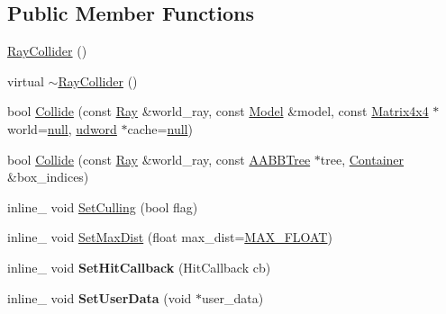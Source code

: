 \subsection*{Public Member Functions}
\begin{DoxyCompactItemize}
\item 
\hyperlink{classOpcode_1_1RayCollider_a541dfc80f2a2e1475bddbf686a3b0090}{Ray\+Collider} ()
\item 
virtual \hyperlink{classOpcode_1_1RayCollider_ac8ff51bee4566173003732f89655b00f}{$\sim$\+Ray\+Collider} ()
\item 
bool \hyperlink{classOpcode_1_1RayCollider_a164bc0ce6313621e1bcc5a57381defc0}{Collide} (const \hyperlink{classOpcode_1_1Ray}{Ray} \&world\+\_\+ray, const \hyperlink{classOpcode_1_1Model}{Model} \&model, const \hyperlink{classOpcode_1_1Matrix4x4}{Matrix4x4} $\ast$world=\hyperlink{IceTypes_8h_ac97b8ee753e4405397a42ad5799b0f9e}{null}, \hyperlink{IceTypes_8h_a44c6f1920ba5551225fb534f9d1a1733}{udword} $\ast$cache=\hyperlink{IceTypes_8h_ac97b8ee753e4405397a42ad5799b0f9e}{null})
\item 
bool \hyperlink{classOpcode_1_1RayCollider_a3d7b11c7f23bdf96e2743da044088f7a}{Collide} (const \hyperlink{classOpcode_1_1Ray}{Ray} \&world\+\_\+ray, const \hyperlink{classOpcode_1_1AABBTree}{A\+A\+B\+B\+Tree} $\ast$tree, \hyperlink{classContainer}{Container} \&box\+\_\+indices)
\item 
inline\+\_\+ void \hyperlink{classOpcode_1_1RayCollider_a188b5c843205ed0100acb9d94f04f143}{Set\+Culling} (bool flag)
\item 
inline\+\_\+ void \hyperlink{classOpcode_1_1RayCollider_ae52ff080cbb19fbd4d4c5c25017571d5}{Set\+Max\+Dist} (float max\+\_\+dist=\hyperlink{IceTypes_8h_afb31aa2d196755fb259d43a03c18c9d7}{M\+A\+X\+\_\+\+F\+L\+O\+AT})
\item 
inline\+\_\+ void {\bfseries Set\+Hit\+Callback} (Hit\+Callback cb)\hypertarget{classOpcode_1_1RayCollider_aa161fb92d3e7a3d8061b98721f5c0727}{}\label{classOpcode_1_1RayCollider_aa161fb92d3e7a3d8061b98721f5c0727}

\item 
inline\+\_\+ void {\bfseries Set\+User\+Data} (void $\ast$user\+\_\+data)\hypertarget{classOpcode_1_1RayCollider_a805937e53124f874d007666989e61932}{}\label{classOpcode_1_1RayCollider_a805937e53124f874d007666989e61932}


\end{DoxyCompactItemize}
